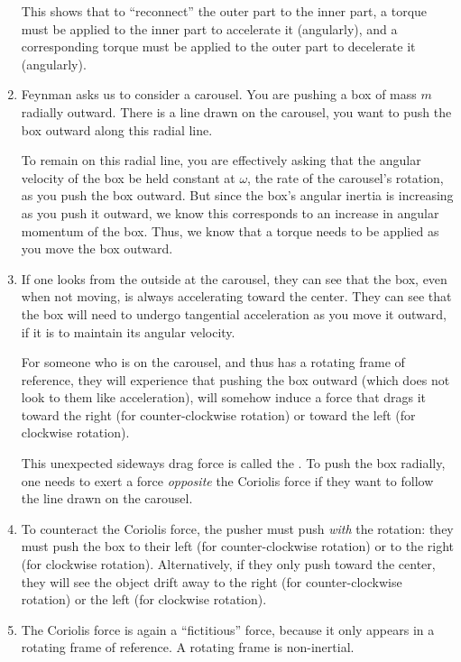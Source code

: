 \begin{enumerate}
  \noindent
  This shows that to ``reconnect'' the outer part to the inner part, a
  torque must be applied to the inner part to accelerate it (angularly),
  and a corresponding torque must be applied to the outer part to
  decelerate it (angularly).

  \item Feynman asks us to consider a carousel. You are pushing a box of
  mass $m$ radially outward. There is a line drawn on the carousel, you
  want to push the box outward along this radial line.

  To remain on this radial line, you are effectively asking that the
  angular velocity of the box be held constant at $\omega$, the rate of
  the carousel's rotation, as you push the box outward. But since the
  box's angular inertia is increasing as you push it outward, we know
  this corresponds to an increase in angular momentum of the box. Thus,
  we know that a torque needs to be applied as you move the box outward.

  \item If one looks from the outside at the carousel, they can see that
  the box, even when not moving, is always accelerating toward the
  center. They can see that the box will need to undergo tangential
  acceleration as you move it outward, if it is to maintain its angular
  velocity.

  For someone who is on the carousel, and thus has a rotating frame of
  reference, they will experience that pushing the box outward (which
  does not look to them like acceleration), will somehow induce a force
  that drags it toward the right (for counter-clockwise rotation) or
  toward the left (for clockwise rotation).

  This unexpected sideways drag force is called the . To push the box radially, one needs to exert a force
  \emph{opposite} the Coriolis force if they want to follow the line
  drawn on the carousel.

  \item To counteract the Coriolis force, the pusher must push
  \emph{with} the rotation: they must push the box to their left (for
  counter-clockwise rotation) or to the right (for clockwise rotation).
  Alternatively, if they only push toward the center, they will see the
  object drift away to the right (for counter-clockwise rotation) or the
  left (for clockwise rotation).

  \item The Coriolis force is again a ``fictitious'' force, because it
  only appears in a rotating frame of reference. A rotating frame is
  non-inertial.


\end{enumerate}
